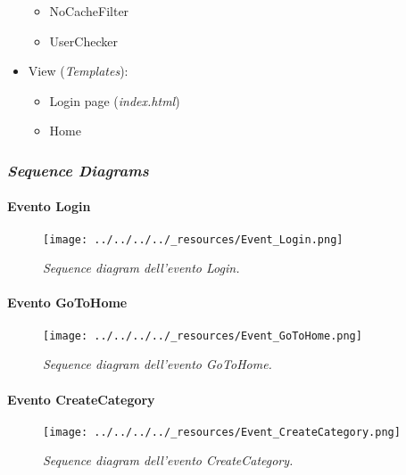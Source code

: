 \begin{itemize}
  \begin{itemize}
  \tightlist
  \item
    NoCacheFilter
  \item
    UserChecker
  \end{itemize}
\item
  View (\emph{Templates}):

  \begin{itemize}
  \tightlist
  \item
    Login page (\emph{index.html})
  \item
    Home
  \end{itemize}
\end{itemize}

\hypertarget{sequence-diagrams}{%
\subsubsection{\texorpdfstring{\emph{Sequence
Diagrams}}{Sequence Diagrams}}\label{sequence-diagrams}}

\hypertarget{evento-login}{%
\paragraph{Evento Login}\label{evento-login}}

\begin{figure}
\centering
\texttt{[image: ../../../../\_resources/Event\_Login.png]}
\caption{\emph{Sequence diagram dell'evento Login.}}
\end{figure}

\hypertarget{evento-gotohome}{%
\paragraph{Evento GoToHome}\label{evento-gotohome}}

\begin{figure}
\centering
\texttt{[image: ../../../../\_resources/Event\_GoToHome.png]}
\caption{\emph{Sequence diagram dell'evento GoToHome.}}
\end{figure}

\hypertarget{evento-createcategory}{%
\paragraph{Evento CreateCategory}\label{evento-createcategory}}

\begin{figure}
\centering
\texttt{[image: ../../../../\_resources/Event\_CreateCategory.png]}
\caption{\emph{Sequence diagram dell'evento CreateCategory.}}
\end{figure}

